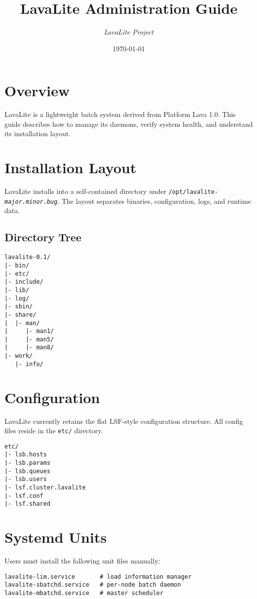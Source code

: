 \documentclass[11pt,a4paper]{article}
\title{\textbf{LavaLite Administration Guide}}
\author{\textit{LavaLite Project}}
\date{\today}
\begin{document}
\maketitle
\tableofcontents

\section{\textbf{Overview}}
LavaLite is a lightweight batch system derived from Platform Lava 1.0.
This guide describes how to manage its daemons, verify system health, and understand its installation layout.

\section{\textbf{Installation Layout}}
LavaLite installs into a self-contained directory under \texttt{/opt/lavalite-\textit{major.minor.bug}}. The layout separates binaries, configuration, logs, and runtime data.

\subsection{\textbf{Directory Tree}}
\begin{verbatim}
lavalite-0.1/
|- bin/
|- etc/
|- include/
|- lib/
|- log/
|- sbin/
|- share/
|  |- man/
|     |- man1/
|     |- man5/
|     |- man8/
|- work/
   |- info/
\end{verbatim}

\section{\textbf{Configuration}}
LavaLite currently retains the flat LSF-style configuration structure. All config files reside in the \texttt{etc/} directory.

\begin{verbatim}
etc/
|- lsb.hosts
|- lsb.params
|- lsb.queues
|- lsb.users
|- lsf.cluster.lavalite
|- lsf.conf
|- lsf.shared
\end{verbatim}

\section{\textbf{Systemd Units}}
Users must install the following unit files manually:

\begin{verbatim}
lavalite-lim.service       # load information manager
lavalite-sbatchd.service   # per-node batch daemon
lavalite-mbatchd.service   # master scheduler
\end{verbatim}
\end{document}
